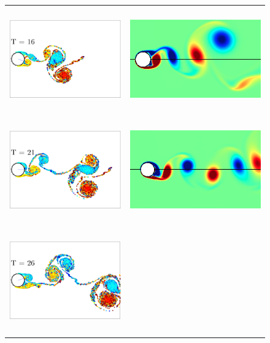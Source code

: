 \begin{figure}
 \begin{center}
 \begin{tabular}{cc}
 \includegraphics[height=4.5cm]{./Figures/results/rotating/vortices_T16.pdf}  &
 \includegraphics[height=4.5cm]{./Figures/results/rotating/T_16.png}  \\
 \includegraphics[height=4.5cm]{./Figures/results/rotating/vortices_T21.pdf}  &
 \includegraphics[height=4.5cm]{./Figures/results/rotating/T_21.png}  \\
 \includegraphics[height=4.5cm]{./Figures/results/rotating/vortices_T26.pdf}  &

\end{tabular}
\end{center}
\end{figure}
